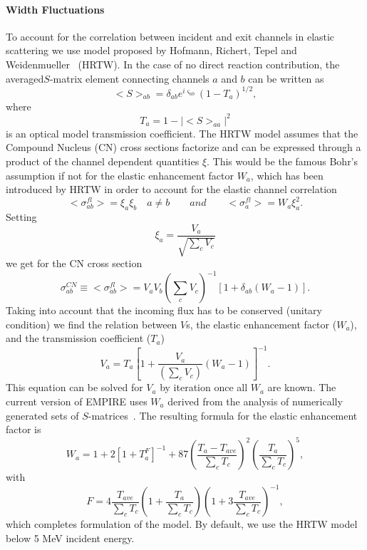 \documentclass[twocolumn,amsmath,amssymb,10pt,groupedaddress,letter]{revtex4}
\begin{document}
\paragraph{Width Fluctuations}
To account for the correlation between incident and exit channels in
elastic scattering we use model proposed by Hofmann, Richert, Tepel
and Weidenmueller~\cite{HRTW} (HRTW). In the case of no direct reaction
contribution, the averaged$S$-matrix element connecting channels $a$ and
$b$ can be written as
\begin{equation}
<S>_{ab}=\delta_{ab}e^{i\varsigma_{ab}}(1-T_{a})^{1/2},
\label{Sab}
\end{equation}
\noindent where
\begin{equation}
T_{a}=1-|<S>_{aa}|^{2}
\label{Ta}
\end{equation}
is an optical model transmission coefficient. The HRTW model assumes
that the Compound Nucleus (CN) cross sections factorize and
can be expressed through a product of the channel dependent quantities
$\xi$. This would be the famous Bohr's assumption if not for the
elastic enhancement factor $W_{a}$, which has been introduced by
HRTW in order to account for the elastic channel correlation
\begin{equation}
<\sigma_{ab}^{fl}>=\xi_{a}\xi_{b}\quad a\neq b\qquad and\qquad<\sigma_{a}^{fl}>=W_{a}\xi_{a}^{2}.
\label{Sig-fluc}
\end{equation}
 Setting
\begin{equation}
\xi_{a}=\frac{V_{a}}{\sqrt{\sum_{c}V_{c}}}
\label{ksi}
\end{equation}
we get for the CN cross section
\begin{equation}
\sigma_{ab}^{CN}\equiv<\sigma_{ab}^{fl}>=V_{a}V_{b}\left(\sum_{c}V_{c}\right)^{-1}\left[1+\delta_{ab}\left(W_{a}-1\right)\right].
\label{Sig-flucV}
\end{equation}
Taking into account that the incoming flux has to be conserved (unitary
condition) we find the relation between $V$s, the elastic enhancement
factor ($W_{a}$), and the transmission coefficient ($T_{a}$)
\begin{equation}
V_{a}=T_{a}\left[1+\frac{V_{a}}{\left(\sum_{c}V_{c}\right)}\left(W_{a}-1\right)\right]^{-1}.
\label{Va}
\end{equation}
This equation can be solved for $V_{a}$ by iteration once all $W_{a}$
are known. The current version of EMPIRE uses $W_{a}$ derived from
the analysis of numerically generated sets of $S$-matrices~\cite{HHM}.
The resulting formula for the elastic enhancement factor is
\begin{equation}
W_{a}=1+2\left[1+T_{a}^{F}\right]^{-1}+87\left(\frac{T_{a}-T_{ave}}{\sum_{c}T_{c}}\right)^{2}\left(\frac{T_{a}}{\sum_{c}T_{c}}\right)^{5},
\label{Wa}
\end{equation}
with
\begin{equation}
F=4\frac{T_{ave}}{\sum_{c}T_{c}}\left(1+\frac{T_{a}}{\sum_{c}T_{c}}\right)\left(1+3\frac{T_{ave}}{\sum_{c}T_{c}}\right)^{-1},
\label{Wa-F}
\end{equation}
which completes formulation of the model.
By default, we use the HRTW model below 5 MeV incident
energy.
\end{document}
